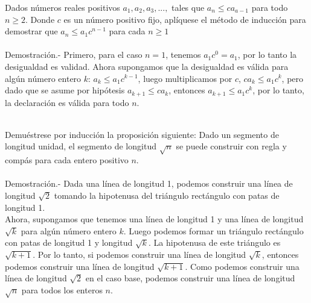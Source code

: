 \begin{teo}
Dados números reales positivos $a_1,a_2,a_3,...,$ tales que $a_n\leq ca_{a-1}$ para todo $n\geq 2$. Donde $c$ es un número positivo fijo, aplíquese el método de inducción para demostrar que $a_n \leq a_1 c^{n-1}$ para cada $n \geq 1$\\\\
Demostración.- \; Primero, para el caso $n=1$, tenemos $a_1c^0=a_1$, por lo tanto la desigualdad es validad. Ahora supongamos que la desigualdad es válida para algún número entero $k$: $a_k\leq a_1c^{k-1}$, luego multiplicamos por $c$, $ca_k\leq a_1c^k$, pero dado que se asume por hipótesis $a_{k+1} \leq ca_k$, entonces $a_{k+1}\leq a_1c^k$, por lo tanto, la declaración es válida para todo $n$.\\\\
\end{teo}

\begin{ej}
Demuéstrese por inducción la proposición siguiente: Dado un segmento de longitud unidad, el segmento de longitud $\sqrt{n}$ se puede construir con regla y compás para cada entero positivo $n$.\\\\
Demostración.- \; Dada una línea de longitud 1, podemos construir una línea de longitud $\sqrt{2}$ tomando la hipotenusa del triángulo rectángulo con patas de longitud 1.\\
Ahora, supongamos que tenemos una línea de longitud 1 y una línea de longitud $\sqrt{k}$ para algún número entero $k$. Luego podemos formar un triángulo rectángulo con patas de longitud 1 y longitud $\sqrt{k}$. La hipotenusa de este triángulo es $\sqrt{k+1}$. Por lo tanto, si podemos construir una línea de longitud $\sqrt{k}$, entonces podemos construir una línea de longitud $\sqrt{k+1}$. Como podemos construir una línea de longitud $\sqrt{2}$ en el caso base, podemos construir una línea de longitud $\sqrt{n}$ para todos los enteros $n$.\\\\
\end{ej}

